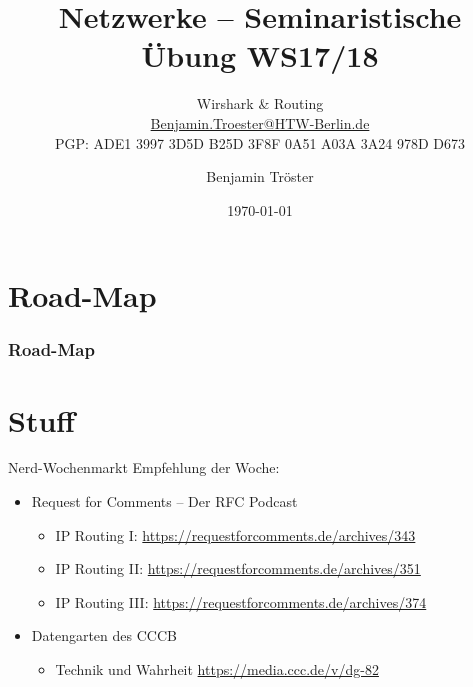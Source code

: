 \documentclass[xcolor=dvipsnames]{beamer}
\begin{document}

\title{Netzwerke -- Seminaristische Übung WS17/18}
\subtitle{Wirshark \& Routing\\
		\href{mailto:Benjamin.Troester@HTW-Berlin.de}{Benjamin.Troester@HTW-Berlin.de}\\
		PGP: ADE1 3997 3D5D B25D 3F8F 0A51 A03A 3A24 978D D673 }
\author{Benjamin Tröster}

\date{\today}

\begin{frame}
\titlepage
\end{frame}

\section*{Road-Map}
\begin{frame}
\frametitle{Road-Map}
\begin{multicols}{2}
  \tableofcontents
\end{multicols}
\end{frame}

\section*{Stuff}
\begin{frame}{Nerd-Wochenmarkt}
Empfehlung der Woche:
\begin{itemize}
	\item Request for Comments -- Der RFC Podcast
	\begin{itemize}
		\item IP Routing I: \url{https://requestforcomments.de/archives/343}
		\item IP Routing II: \url{https://requestforcomments.de/archives/351}
		\item IP Routing III: \url{https://requestforcomments.de/archives/374}   
	\end{itemize}
	\item Datengarten des CCCB
	\begin{itemize}
		\item Technik und Wahrheit \url{https://media.ccc.de/v/dg-82}
	\end{itemize}
\end{itemize}
\end{frame}
\end{document}
